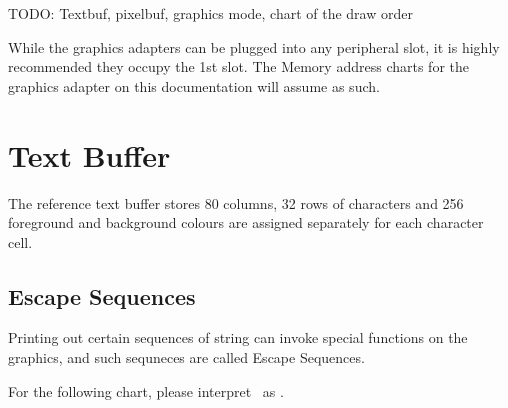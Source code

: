 TODO: Textbuf, pixelbuf, graphics mode, chart of the draw order

While the graphics adapters can be plugged into any peripheral slot, it is highly recommended they occupy the 1st slot. The Memory address charts for the graphics adapter on this documentation will assume as such.

\section{Text Buffer}

The reference text buffer stores 80 columns, 32 rows of characters and 256 foreground and background colours are assigned separately for each character cell.

\subsection{Escape Sequences}

\newcommand{\csi}{{\condensedfont{CSI}}}

Printing out certain sequences of string can invoke special functions on the graphics, and such sequneces are called Escape Sequences.

For the following chart, please interpret \csi\ as \code{\rs{}x1B [}.

